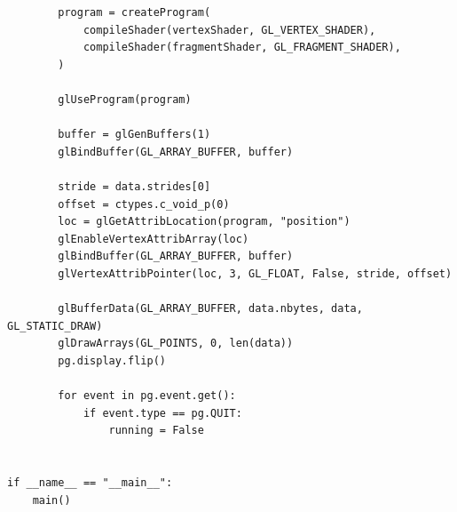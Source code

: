 \documentclass[12pt]{article}
\begin{document}
\begin{verbatim}
        program = createProgram(
            compileShader(vertexShader, GL_VERTEX_SHADER),
            compileShader(fragmentShader, GL_FRAGMENT_SHADER),
        )

        glUseProgram(program)

        buffer = glGenBuffers(1)
        glBindBuffer(GL_ARRAY_BUFFER, buffer)

        stride = data.strides[0]
        offset = ctypes.c_void_p(0)
        loc = glGetAttribLocation(program, "position")
        glEnableVertexAttribArray(loc)
        glBindBuffer(GL_ARRAY_BUFFER, buffer)
        glVertexAttribPointer(loc, 3, GL_FLOAT, False, stride, offset)

        glBufferData(GL_ARRAY_BUFFER, data.nbytes, data, GL_STATIC_DRAW)
        glDrawArrays(GL_POINTS, 0, len(data))
        pg.display.flip()

        for event in pg.event.get():
            if event.type == pg.QUIT:
                running = False


if __name__ == "__main__":
    main()
\end{verbatim}
\clearpage
\end{document}
